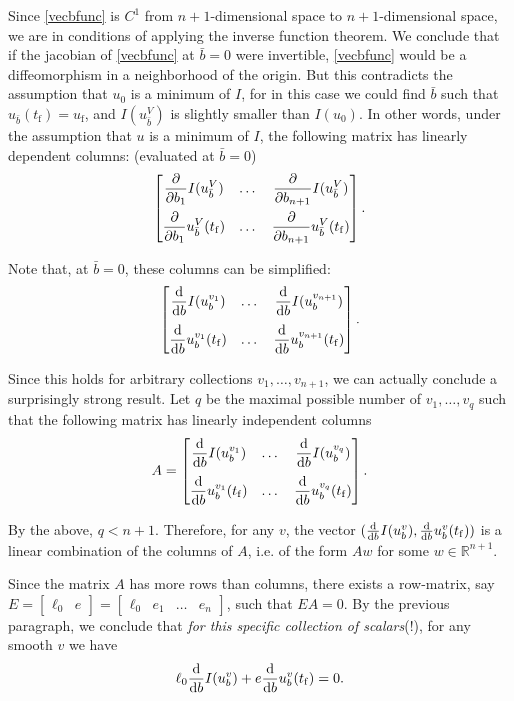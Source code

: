 \documentclass{article}
\theoremstyle{plain}
\theoremstyle{plain}
\theoremstyle{nonumberplain}
\theoremstyle{empty}
\newcommand{\R}{\mathbb{R}}
\newcommand{\tend}{\mathrm{f}}
\newcommand{\vecb}{{\bar{b}}}
\begin{document}
Since \eqref{vecbfunc} is $C^1$ from $n+1$-dimensional space to $n+1$-dimensional space, we are in conditions of applying the inverse function theorem. We conclude that if the jacobian of \eqref{vecbfunc} at $\vecb = 0$ were invertible, \eqref{vecbfunc} would be a diffeomorphism in a neighborhood of the origin. But this contradicts the assumption that $u_0$ is a minimum of $I$, for in this case we could find $\vecb$ such that $u_\vecb(t_\tend) = u_\tend$, and $I(u_\vecb^V)$ is slightly smaller than $I(u_0)$. In other words, under the assumption that $u$ is a minimum of $I$, the following matrix has linearly dependent columns: (evaluated at $\vecb = 0$)
\[
\begin{bmatrix}
\displaystyle \diffp*{I(u_\vecb^V)}{b_1} & \dots & \displaystyle \diffp*{I(u_\vecb^V)}{b_{n+1}}\\[1em]
\displaystyle \diffp*{u_\vecb^V(t_\tend)}{b_1} & \dots &\displaystyle \diffp*{u_\vecb^V(t_\tend)}{b_{n+1}}
\end{bmatrix}.
\]

Note that, at $\vecb = 0$, these columns can be simplified:
\[
\begin{bmatrix}
\displaystyle \diff*{I(u_b^{v_1})}{b} & \dots & \displaystyle \diff*{I(u_b^{v_{n+1}})}{b}\\[1em]
\displaystyle \diff*{u_b^{v_1}(t_\tend)}{b} & \dots & \displaystyle \diff*{u_b^{v_{n+1}}(t_\tend)}{b}
\end{bmatrix}.
\]

Since this holds for arbitrary collections $v_1, \dots, v_{n+1}$, we can actually conclude a surprisingly strong result. Let $q$ be the maximal possible number of $v_1, \dots, v_q$ such that the following matrix has linearly independent columns
\[
A =
\begin{bmatrix}
\displaystyle \diff*{I(u_b^{v_1})}{b} & \dots & \displaystyle \diff*{I(u_b^{v_{q}})}{b}\\[1em]
\displaystyle \diff*{u_b^{v_1}(t_\tend)}{b} & \dots & \displaystyle \diff*{u_b^{v_{q}}(t_\tend)}{b}
\end{bmatrix}.
\]

By the above, $q < n+1$. Therefore, for any $v$, the vector $(\diff*{I(u_b^v)}{b}, \diff*{u_b^v(t_\tend)}{b})$ is a linear combination of the columns of $A$, i.e. of the form $Aw$ for some $w \in \R^{n+1}$.

Since the matrix $A$ has more rows than columns, there exists a row-matrix, say $E = \begin{bmatrix} \ell_0 & e \end{bmatrix} = \begin{bmatrix} \ell_0 & e_1 & \dots & e_n\end{bmatrix}$, such that $E A = 0$. By the previous paragraph, we conclude that \emph{for this specific collection of scalars}(!), for any smooth $v$ we have
\begin{equation}\label{premultiplier}
\ell_0 \diff*{I(u_b^v)}{b} + e \diff*{u_b^v(t_\tend)}{b} = 0.
\end{equation}
\end{document}
